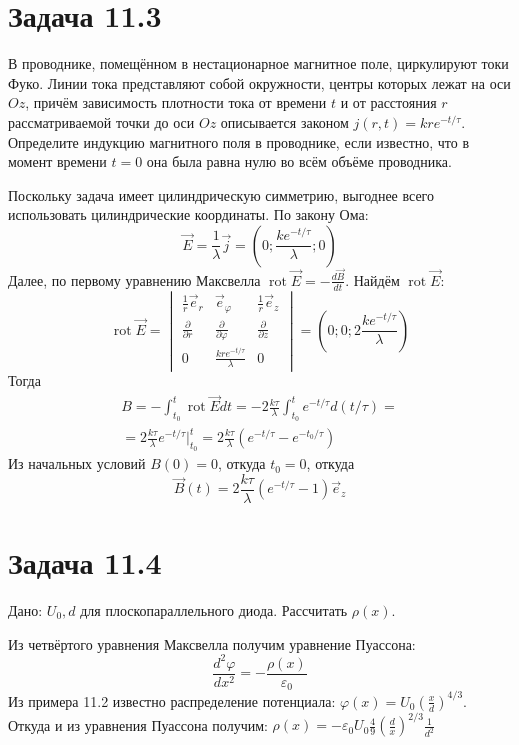 \documentclass[11pt]{article}
\begin{document}
\section{Задача 11.3}
\label{sec:org69f953c}
В проводнике, помещённом в нестационарное магнитное поле, циркулируют токи Фуко. Линии тока представляют собой
окружности, центры которых лежат на оси \(Oz\), причём зависимость плотности тока от времени \(t\) и от расстояния
\(r\) рассматриваемой точки до оси \(Oz\) описывается законом \(j(r,t) = kre^{-t/\tau}\). Определите индукцию магнитного
поля в проводнике, если известно, что в момент времени \(t = 0\) она была равна нулю во всём объёме проводника.

Поскольку задача имеет цилиндрическую симметрию, выгоднее всего использовать цилиндрические координаты. По закону
Ома:
$$\vec E = \frac{1}\lambda \vec j = \left(0; \frac{ke^{-t/\tau}}\lambda; 0\right)$$
Далее, по первому уравнению Максвелла \(\operatorname{rot}\vec E = -\frac{d\vec B}{dt}\). Найдём
\(\operatorname{rot}\vec E\):
\begin{equation}
\operatorname{rot}\vec E =
\begin{vmatrix}
\frac{1}r\vec e_r           & \vec e_\varphi                   & \frac{1}r\vec e_z \\
\frac{\partial}{\partial r} & \frac{\partial}{\partial\varphi} & \frac{\partial}{\partial z} \\
0                           & \frac{kre^{-t/\tau}}\lambda       & 0
\end{vmatrix}
= \left(0; 0; 2\frac{ke^{-t/\tau}}\lambda\right)
\end{equation}
Тогда
\begin{multline}
B = -\int_{t_0}^t\operatorname{rot}\vec E dt = -2\frac{k\tau}{\lambda}\int_{t_0}^te^{-t/\tau}d(t/\tau) = \\
= 2\frac{k\tau}{\lambda}e^{-t/\tau}\bigg|_{t_0}^t = 2\frac{k\tau}{\lambda}(e^{-t/\tau} - e^{-t_0/\tau})
\end{multline}
Из начальных условий \(B(0) = 0\), откуда \(t_0 = 0\), откуда
$$\vec B(t) = 2\frac{k\tau}\lambda(e^{-t/\tau} - 1)\vec e_z$$
\section{Задача 11.4}
\label{sec:orgca2738d}
Дано: \(U_0, d\) для плоскопараллельного диода. Рассчитать \(\rho(x)\).

Из четвёртого уравнения Максвелла получим уравнение Пуассона:
$$\frac{d^2\varphi}{dx^2} = -\frac{\rho(x)}{\varepsilon_0}$$
Из примера 11.2 известно распределение потенциала: \(\varphi(x) = U_0\left(\frac{x}d\right)^{4/3}\).
Откуда и из уравнения Пуассона получим: \(\rho(x) = -\varepsilon_0U_0\frac{4}{9}\left(\frac{d}x\right)^{2/3}\frac{1}{d^2}\)
\end{document}
